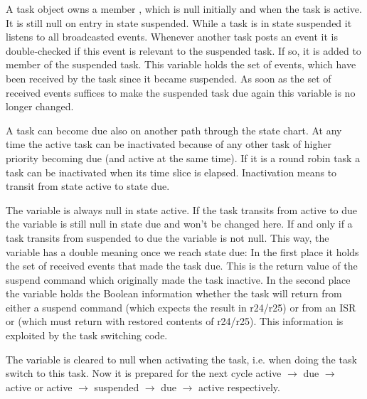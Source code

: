 
A task object owns a member , which is null
initially and when the task is active. It is still null on entry in state
suspended. While a task is in state suspended it listens to all
broadcasted events. Whenever another task posts an event it is
double-checked if this event is relevant to the suspended task. If so, it
is added to member  of the suspended task. This
variable holds the set of events, which have been received by the task
since it became suspended. As soon as the set of received events suffices
to make the suspended task due again this variable is no longer changed.

A task can become due also on another path through the state chart. At any
time the active task can be inactivated because of any other task of
higher priority becoming due (and active at the same time). If it is a
round robin task a task can be inactivated when its time slice is
elapsed. Inactivation means to transit from state active to state due.

The variable  is always null in state active. If the
task transits from active to due the variable is still null in state due
and won't be changed here. If and only if a task transits from suspended
to due the variable is not null. This way, the variable has a double
meaning once we reach state due: In the first place it holds the set of
received events that made the task due. This is the return value of the
suspend command which originally made the task inactive. In the second
place the variable holds the Boolean information whether the task will
return from either a suspend command (which expects the result in r24/r25)
or from an ISR or  (which must return with restored
contents of r24/r25). This information is exploited by the task switching
code.

The variable  is cleared to null when activating the
task, i.e. when doing the task switch to this task. Now it is prepared for
the next cycle active $\rightarrow$ due $\rightarrow$ active or active
$\rightarrow$ suspended $\rightarrow$ due $\rightarrow$ active
respectively.


